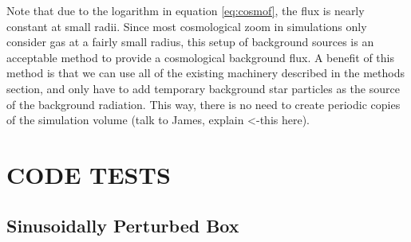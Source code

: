 \documentclass[fleq,usenatbib]{mnras}
\begin{document}
Note that due to the logarithm in equation \ref{eq:cosmof}, the flux is nearly 
constant at small radii. Since most cosmological zoom in simulations only 
consider gas at a fairly small radius, this setup of background sources is an 
acceptable method to provide a cosmological background flux. A benefit of this 
method is that we can use all of the existing machinery described in the 
methods section, and only have to add temporary background star particles as 
the source of the background radiation. This way, there is no need to create 
periodic copies of the simulation volume (talk to James, explain <-this here).

\section{CODE TESTS}\label{sec:tsts}
\subsection{Sinusoidally Perturbed Box}
\end{document}
